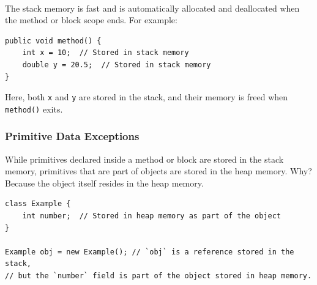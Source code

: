 \documentclass[letterpaper,12pt]{article}
\begin{document}
\\
The stack memory is fast and is automatically allocated and deallocated when the method or block scope ends. For example:
\begin{verbatim}
public void method() {
    int x = 10;  // Stored in stack memory
    double y = 20.5;  // Stored in stack memory
}
\end{verbatim}
Here, both \texttt{x} and \texttt{y} are stored in the stack, and their memory is freed when \texttt{method()} exits.
\subsubsection{Primitive Data Exceptions}
While primitives declared inside a method or block are stored in the stack memory, primitives that are part of objects are stored in the heap memory. Why? Because the object itself resides in the heap memory.
\begin{verbatim}
class Example {
    int number;  // Stored in heap memory as part of the object
}

Example obj = new Example(); // `obj` is a reference stored in the stack,
// but the `number` field is part of the object stored in heap memory.
\end{verbatim}
\end{document}
